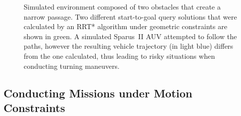 \begin{figure}[htbp]
    \myfloatalign
     \quad
\caption[Simulation of the Sparus~II AUV attempting to follow a solution path
calculated by an RRT* under geometric constraints.]
{Simulated environment composed of two obstacles that create a narrow passage.
Two different start-to-goal query solutions that were calculated by an \ac{RRT*}
algorithm under geometric constraints are shown in green. A simulated Sparus~II
\ac{AUV} attempted to follow the paths, however the resulting vehicle trajectory
(in light blue) differs from the one calculated, thus leading to risky
situations when conducting turning maneuvers.}
\label{fig:PlannGeomRRTstarQueries}
\end{figure}

\subsection{Conducting Missions under Motion Constraints}

